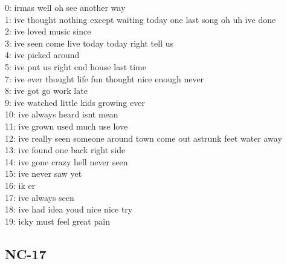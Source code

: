 \documentclass[a4paper]{article}
\begin{document}
\begin{center}
    0:  irmas well oh see another way\\
    1:  ive thought nothing except waiting today one last song oh uh ive done\\
    2:  ive loved music since\\
    3:  ive seen come live today today right tell us\\
    4:  ive picked around\\
    5:  ive put us right end house last time\\
    7:  ive ever thought life fun thought nice enough never\\
    8:  ive got go work late\\
    9:  ive watched little kids growing ever\\
    10:  ive always heard isnt mean\\
    11:  ive grown used much use love\\
    12:  ive really seen someone around town come out astrunk feet water away\\
    13:  ive found one back right side\\
    14:  ive gone crazy hell never seen\\
    15:  ive never saw yet\\
    16:  ik er\\
    17:  ive always seen\\
    18:  ive had idea youd nice nice try\\
    19:  icky must feel great pain\\
\end{center}

\subsection*{NC-17}
\end{document}

